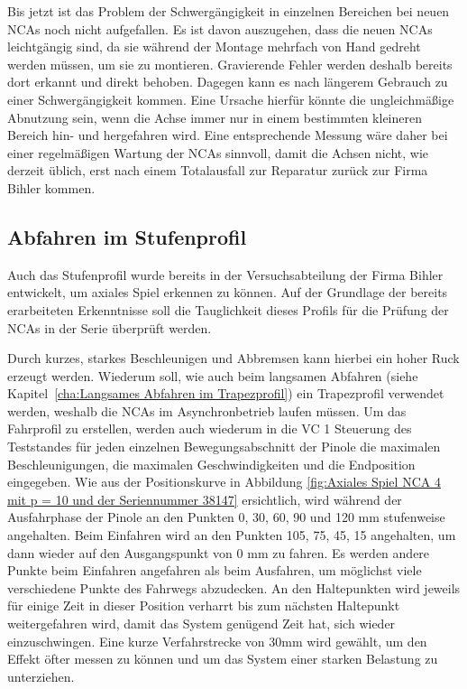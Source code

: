 Bis jetzt ist das Problem der Schwergängigkeit in einzelnen Bereichen bei neuen NCAs noch nicht aufgefallen. Es ist davon auszugehen, dass die neuen NCAs leichtgängig sind, da sie während der Montage mehrfach von Hand gedreht werden müssen, um sie zu montieren. Gravierende Fehler werden deshalb bereits dort erkannt und direkt behoben. Dagegen kann es nach längerem Gebrauch zu einer Schwergängigkeit kommen. Eine Ursache hierfür könnte die ungleichmäßige Abnutzung sein, wenn die Achse immer nur in einem bestimmten kleineren Bereich hin- und hergefahren wird. Eine entsprechende Messung wäre daher bei einer regelmäßigen Wartung der NCAs sinnvoll, damit die Achsen nicht, wie derzeit üblich, erst nach einem Totalausfall zur Reparatur zurück zur Firma Bihler kommen.






\subsection{Abfahren im Stufenprofil}\label{cha:Abfahren im Stufenprofil}


Auch das Stufenprofil wurde bereits in der Versuchsabteilung der Firma Bihler entwickelt, um axiales Spiel erkennen zu können. Auf der Grundlage der bereits erarbeiteten Erkenntnisse soll die Tauglichkeit dieses Profils für die Prüfung der NCAs in der Serie überprüft werden. 

Durch kurzes, starkes Beschleunigen und Abbremsen kann hierbei ein hoher Ruck erzeugt werden. Wiederum soll, wie auch beim langsamen Abfahren (siehe Kapitel~\ref{cha:Langsames Abfahren im Trapezprofil}) ein Trapezprofil verwendet werden, weshalb die NCAs im Asynchronbetrieb laufen müssen. Um das Fahrprofil zu erstellen, werden auch wiederum in die VC 1 Steuerung des Teststandes für jeden einzelnen Bewegungsabschnitt der Pinole die maximalen Beschleunigungen, die maximalen Geschwindigkeiten und die Endposition eingegeben. Wie aus der Positionskurve in Abbildung \ref{fig:Axiales Spiel NCA 4 mit p = 10 und der Seriennummer 38147} ersichtlich, wird während der Ausfahrphase der Pinole an den Punkten 0, 30, 60, 90 und 120 mm stufenweise angehalten. Beim Einfahren wird an den Punkten 105, 75, 45, 15 angehalten, um dann wieder auf den Ausgangspunkt von 0 mm zu fahren. Es werden andere Punkte beim Einfahren angefahren als beim Ausfahren, um möglichst viele verschiedene Punkte des Fahrwegs abzudecken. An den Haltepunkten wird jeweils für einige Zeit in dieser Position verharrt bis zum nächsten Haltepunkt weitergefahren wird, damit das System genügend Zeit hat, sich wieder einzuschwingen. Eine kurze Verfahrstrecke von 30mm wird gewählt, um den Effekt öfter messen zu können und um das System einer starken Belastung zu unterziehen.


